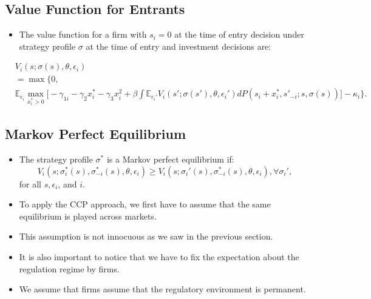 \documentclass[
]{book}
\providecommand{\tightlist}{%
  \setlength{\itemsep}{0pt}\setlength{\parskip}{0pt}}
\begin{document}
\hypertarget{value-function-for-entrants}{%
\subsection{Value Function for Entrants}\label{value-function-for-entrants}}

\begin{itemize}
\tightlist
\item
  The value function for a firm with \(s_i = 0\) at the time of entry
  decision under strategy profile \(\sigma\) at the time of entry and
  investment decisions are:
\end{itemize}

\begin{equation}
\begin{split}
&V_i(s; \sigma(s), \theta, \epsilon_i)\\
&=\max\Bigg\{0, \\
&\mathbb{E}_{\epsilon_i} \max_{x_i^* > 0} \Bigg[ - \gamma_{1i} - \gamma_2 x_i^* - \gamma_3 x_i^2 + \beta \int \mathbb{E}_{\epsilon_i'} V_i(s'; \sigma(s'), \theta, \epsilon_i') dP(s_i + x_i^*, s'_{-i}; s, \sigma(s))\Bigg] - \kappa_i\Bigg\}.
\end{split}
\end{equation}

\hypertarget{markov-perfect-equilibrium-1}{%
\subsection{Markov Perfect Equilibrium}\label{markov-perfect-equilibrium-1}}

\begin{itemize}
\tightlist
\item
  The strategy profile \(\sigma^*\) is a Markov perfect equilibrium if:
  \begin{equation}
  V_i(s; \sigma_i^*(s), \sigma_{-i}^*(s), \theta, \epsilon_i) \ge V_i(s; \sigma_i'(s), \sigma_{-i}^*(s), \theta, \epsilon_i), \forall \sigma_i',
  \end{equation} for all \(s, \epsilon_i\), and \(i\).
\item
  To apply the CCP approach, we first have to assume that the same
  equilibrium is played across markets.
\item
  This assumption is not innocuous as we saw in the previous section.
\item
  It is also important to notice that we have to fix the expectation
  about the regulation regime by firms.
\item
  We assume that firms assume that the regulatory environment is
  permanent.
\end{itemize}
\end{document}
